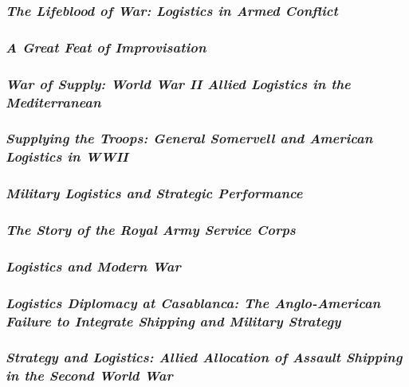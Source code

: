 \documentclass[noraggedright]{turabian-researchpaper}
\begin{document}
		\subsubsection{\textit{The Lifeblood of War: Logistics in
			Armed Conflict}}
		\subsubsection{\textit{A Great Feat of Improvisation}}


		\subsubsection{\textit{War of Supply:  World War II Allied
			Logistics in the Mediterranean}}
		\subsubsection{\textit{Supplying the Troops:  General 
			Somervell and American Logistics in WWII}}
		\subsubsection{\textit{Military Logistics and Strategic 
			Performance}}
		\subsubsection{\textit{The Story of the Royal Army Service
			Corps}}
		\subsubsection{\textit{Logistics and Modern War}}
		\subsubsection{\textit{Logistics Diplomacy at Casablanca: 
			The Anglo-American Failure to Integrate Shipping and
			Military Strategy}}
		\subsubsection{\textit{Strategy and Logistics:  Allied
			Allocation of Assault Shipping in the Second World
			War}}
\end{document}
